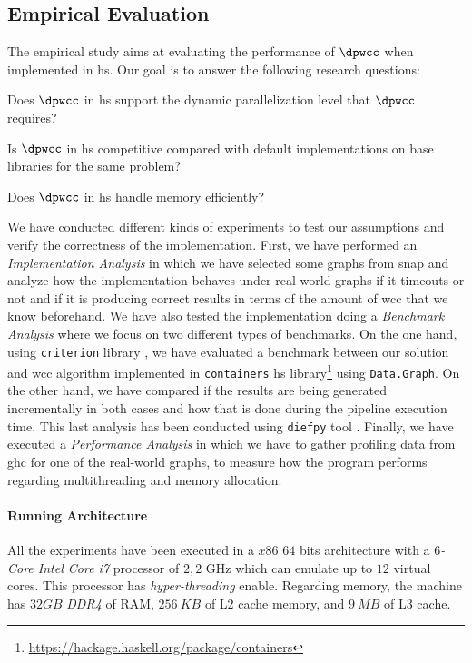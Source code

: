 \subsection{Empirical Evaluation}\label{sec:evaluation}
The empirical study aims at evaluating the performance of $\dpwcc$ when implemented in \acrshort{hs}. 
Our goal is to answer the following research questions: 

\begin{inparaenum}[\bf {\bf RQ}1\upshape)]
\label{res:question}
    \item Does $\dpwcc$ in \acrshort{hs} support the dynamic parallelization level that $\dpwcc$ requires?
    \item Is $\dpwcc$ in \acrshort{hs} competitive compared with default implementations on base libraries for the same problem?
    \item Does $\dpwcc$ in \acrshort{hs} handle memory efficiently?
\end{inparaenum}

We have conducted different kinds of experiments to test our assumptions and verify the correctness of the implementation.
First, we have performed an \emph{Implementation Analysis} in which we have selected some graphs from \acrfull{snap} \cite{stanford} and analyze how the implementation behaves under real-world graphs if it timeouts or not and if it is producing correct results in terms of the amount of \acrshort{wcc} that we know beforehand.
We have also tested the implementation doing a \emph{Benchmark Analysis} where we focus on two different types of benchmarks. On the one hand, using \texttt{criterion} library \cite{criterion}, we have evaluated a benchmark between our solution and \acrshort{wcc} algorithm implemented in \texttt{containers} \acrshort{hs} library\footnote{\url{https://hackage.haskell.org/package/containers}} using \texttt{Data.Graph}. On the other hand, we have compared if the results are being generated incrementally in both cases and how that is done during the pipeline execution time. This last analysis has been conducted using \texttt{diefpy} tool \cite{diefpaper,diefpy}.
Finally, we have executed a \textit{Performance Analysis} in which we have to gather profiling data from \acrfull{ghc} for one of the real-world graphs, to measure how the program performs regarding multithreading and memory allocation.

\paragraph{Running Architecture}
All the experiments have been executed in a $x86$ $64$ bits architecture with a \textit{$6$-Core Intel Core i7} processor of $2,2$ GHz which can emulate up to $12$ virtual cores. This processor has \emph{hyper-threading} enable. Regarding memory, the machine has $32 GB$ \emph{DDR4} of RAM, $256\ KB$ of L2 cache memory, and $9\ MB$ of L3 cache.

